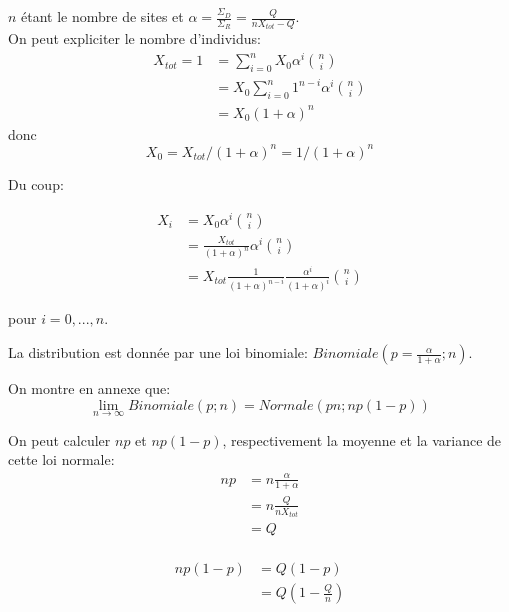 $n$ étant le nombre de sites et $\alpha = \frac{\Sigma_D}{\Sigma_R} = \frac{Q}{nX_{tot}-Q}$.\\

On peut expliciter le nombre d'individus:
\begin{equation}
\begin{aligned}
X_{tot}=1&=\sum_{i=0}^{n}X_0\alpha^i\binom{n}{i}\\
		&= X_0 \sum_{i=0}^n1^{n-i}\alpha^i\binom{n}{i}\\
		&= X_0 (1+\alpha)^n 
\end{aligned}
\end{equation}
donc
\begin{equation}
X_0 = X_{tot}/(1+\alpha)^n=1/(1+\alpha)^n
\end{equation}

Du coup:

\begin{equation}
\begin{aligned}
X_i &= X_0 \alpha^i \binom{n}{i}\\
	&= \frac{X_{tot}}{(1+\alpha)^n}\alpha^i \binom{n}{i}\\
	&= X_{tot}\frac{1}{(1+\alpha)^{n-i}}\frac{\alpha^i}{(1+\alpha)^i}\binom{n}{i}
\end{aligned}
\end{equation}

pour $i=0,...,n$.

La distribution est donnée par une loi binomiale: $Binomiale(p=\frac{\alpha}{1+\alpha};n)$.

On montre en annexe que: $$\lim_{n\rightarrow\infty} Binomiale(p;n) = Normale(pn;np(1-p))$$

On peut calculer $np$ et $np(1-p)$, respectivement la moyenne et la variance de cette loi normale:
\begin{equation}
\begin{aligned}
np	&= n \frac{\alpha}{1+\alpha}\\
	&= n \frac{Q}{nX_{tot}}\\
	&= Q\\
\end{aligned}
\end{equation}

\begin{equation}
\begin{aligned}
np(1-p) &= Q(1-p)\\
		&= Q(1-\frac{Q}{n})\\
\end{aligned}
\end{equation}

